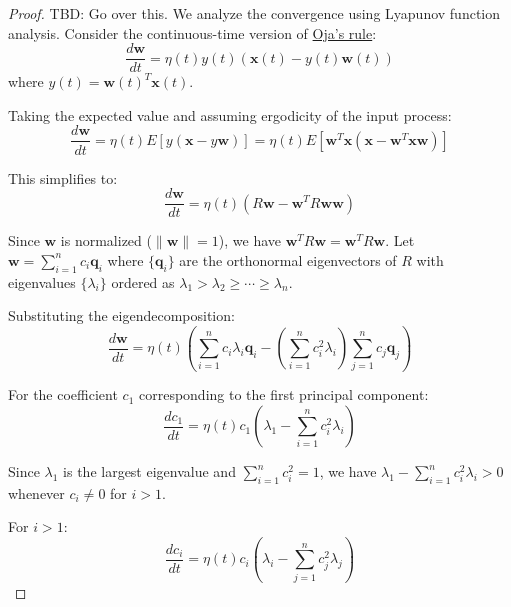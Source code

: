   \begin{proof}
    TBD: Go over this. We analyze the convergence using Lyapunov function analysis. Consider the continuous-time version of \hyperref[thm:ojas-rule]{Oja's rule}:
    \begin{equation}
      \frac{d\mathbf{w}}{dt} = \eta(t) y(t) (\mathbf{x}(t) - y(t) \mathbf{w}(t))
    \end{equation}
    where $y(t) = \mathbf{w}(t)^T \mathbf{x}(t)$.
   
    Taking the expected value and assuming ergodicity of the input process:
    \begin{equation}
      \frac{d\mathbf{w}}{dt} = \eta(t) E[y(\mathbf{x} - y\mathbf{w})] = \eta(t) E[\mathbf{w}^T\mathbf{x}(\mathbf{x} - \mathbf{w}^T\mathbf{x}\mathbf{w})]
    \end{equation}
   
    This simplifies to:
    \begin{equation}
      \frac{d\mathbf{w}}{dt} = \eta(t) (R\mathbf{w} - \mathbf{w}^T R \mathbf{w} \mathbf{w})
    \end{equation}
   
    Since $\mathbf{w}$ is normalized ($\|\mathbf{w}\| = 1$), we have $\mathbf{w}^T R \mathbf{w} = \mathbf{w}^T R \mathbf{w}$. Let $\mathbf{w} = \sum_{i=1}^n c_i \mathbf{q}_i$ where $\{\mathbf{q}_i\}$ are the orthonormal eigenvectors of $R$ with eigenvalues $\{\lambda_i\}$ ordered as $\lambda_1 > \lambda_2 \geq \cdots \geq \lambda_n$.
   
    Substituting the eigendecomposition:
    \begin{equation}
      \frac{d\mathbf{w}}{dt} = \eta(t) \left(\sum_{i=1}^n c_i \lambda_i \mathbf{q}_i - \left(\sum_{i=1}^n c_i^2 \lambda_i\right) \sum_{j=1}^n c_j \mathbf{q}_j\right)
    \end{equation}
   
    For the coefficient $c_1$ corresponding to the first principal component:
    \begin{equation}
      \frac{dc_1}{dt} = \eta(t) c_1 \left(\lambda_1 - \sum_{i=1}^n c_i^2 \lambda_i\right)
    \end{equation}
   
    Since $\lambda_1$ is the largest eigenvalue and $\sum_{i=1}^n c_i^2 = 1$, we have $\lambda_1 - \sum_{i=1}^n c_i^2 \lambda_i > 0$ whenever $c_i \neq 0$ for $i > 1$.
   
    For $i > 1$:
    \begin{equation}
      \frac{dc_i}{dt} = \eta(t) c_i \left(\lambda_i - \sum_{j=1}^n c_j^2 \lambda_j\right)
    \end{equation}
   

\end{proof}

